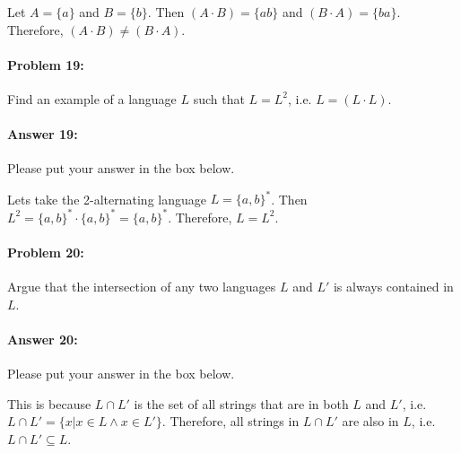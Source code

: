 \documentclass[10pt]{article}
\newenvironment{AnswerBox}{\begin{mdframed}[style=simple]}{\end{mdframed}}
\begin{document}
\begin{AnswerBox}%

  Let $A = \{a\}$ and $B = \{b\}$. Then $(A\cdot B) = \{ab\}$ and $(B\cdot A) = \{ba\}$. Therefore, $(A\cdot B) \neq (B\cdot A)$.

\end{AnswerBox}%

\noindent\hrulefill %

\paragraph{Problem 19:}
Find an example of a language $L$ such that $L=L^2$, i.e. $L=(L\cdot L)$.

\paragraph{Answer 19:} Please put your answer in the box below.

\begin{AnswerBox}%

  Lets take the 2-alternating language $L = \{a, b\}^*$. Then $L^2 = \{a, b\}^* \cdot \{a, b\}^* = \{a, b\}^*$. Therefore, $L = L^2$.

\end{AnswerBox}%

\noindent\hrulefill %

\paragraph{Problem 20:}
Argue that the intersection of any two languages $L$ and $L'$ is always
contained in $L$.

\paragraph{Answer 20:} Please put your answer in the box below.

\begin{AnswerBox}%

  This is because $L \cap L'$ is the set of all strings that are in both $L$ and $L'$, i.e. $L \cap L' = \{x | x \in L \land x \in L'\}$. Therefore, all strings in $L \cap L'$ are also in $L$, i.e. $L \cap L' \subseteq L$.

\end{AnswerBox}%
\end{document}
